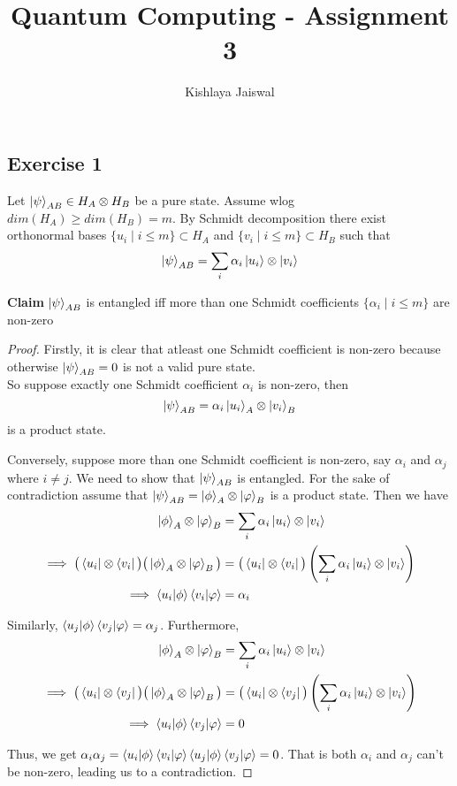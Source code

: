 \documentclass{article}
\title{Quantum Computing - Assignment 3}
\author{Kishlaya Jaiswal}
\begin{document}
\maketitle


\subsection*{Exercise 1}
Let $\ket{\psi}_{AB} \in H_A \otimes H_B$ be a pure state. Assume wlog $dim(H_A) \geq dim(H_B) = m$. By Schmidt decomposition there exist orthonormal bases $\{u_i \mid i \leq m\} \subset H_A$ and $\{v_i \mid i \leq m\} \subset H_B$ such that $$\ket{\psi}_{AB} = \sum_i \alpha_i \ket{u_i} \otimes \ket{v_i}$$

\textbf{Claim} $\ket{\psi}_{AB}$ is entangled iff more than one Schmidt coefficients $\{\alpha_i \mid i \leq m\}$ are non-zero
\begin{proof}
Firstly, it is clear that atleast one Schmidt coefficient is non-zero because otherwise $\ket{\psi}_{AB} = 0$ is not a valid pure state. \\

So suppose exactly one Schmidt coefficient $\alpha_i$ is non-zero, then
$$\ket{\psi}_{AB} = \alpha_i \ket{u_i}_A \otimes \ket{v_i}_B$$ is a product state.

Conversely, suppose more than one Schmidt coefficient is non-zero, say $\alpha_i$ and $\alpha_j$ where $i \neq j$. We need to show that $\ket{\psi}_{AB}$ is entangled. For the sake of contradiction assume that $\ket{\psi}_{AB} = \ket{\phi}_A \otimes \ket{\varphi}_B$ is a product state. Then we have
\begin{align*}
    \ket{\phi}_A \otimes \ket{\varphi}_B &= \sum_i \alpha_i \ket{u_i} \otimes \ket{v_i} \\
    \implies \big(\bra{u_i} \otimes \bra{v_i}\big) \big(\ket{\phi}_A \otimes \ket{\varphi}_B\big) &= \big(\bra{u_i} \otimes \bra{v_i}\big) \left(\sum_i \alpha_i \ket{u_i} \otimes \ket{v_i}\right) \\
    \implies \braket{u_i | \phi} \braket{v_i | \varphi} &= \alpha_i
\end{align*}

Similarly, $\braket{u_j | \phi} \braket{v_j | \varphi} = \alpha_j$. Furthermore,
\begin{align*}
    \ket{\phi}_A \otimes \ket{\varphi}_B &= \sum_i \alpha_i \ket{u_i} \otimes \ket{v_i} \\
    \implies \big(\bra{u_i} \otimes \bra{v_j}\big) \big(\ket{\phi}_A \otimes \ket{\varphi}_B \big) &= \big(\bra{u_i} \otimes \bra{v_j} \big) \left(\sum_i \alpha_i \ket{u_i} \otimes \ket{v_i}\right) \\
    \implies \braket{u_i | \phi} \braket{v_j | \varphi} &= 0
\end{align*}

Thus, we get $\alpha_i \alpha_j = \braket{u_i | \phi} \braket{v_i | \varphi} \braket{u_j | \phi} \braket{v_j | \varphi} = 0$. That is both $\alpha_i$ and $\alpha_j$ can't be non-zero, leading us to a contradiction.

\end{proof}
\end{document}
